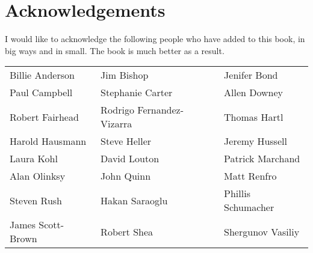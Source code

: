 
    \chapter*{Acknowledgements}
    \thispagestyle{empty}

    I would like to acknowledge the following people who have added to this book, in big ways and in small.  The book is much better as a result. 

    \vspace{.5in}

    \begin{doublespace}
    \begin{tabular}{p{2in}p{2in}p{2in}}
    Billie Anderson&Jim Bishop&Jenifer Bond\\
Paul Campbell&Stephanie Carter&Allen Downey\\
Robert Fairhead&Rodrigo Fernandez-Vizarra&Thomas Hartl\\
Harold Hausmann&Steve Heller&Jeremy Hussell\\
Laura Kohl&David Louton&Patrick Marchand\\
Alan Olinksy&John Quinn&Matt Renfro\\
Steven Rush&Hakan Saraoglu&Phillis Schumacher\\
James Scott-Brown&Robert Shea&Shergunov Vasiliy\\

     \end{tabular}
    \end{doublespace}
    